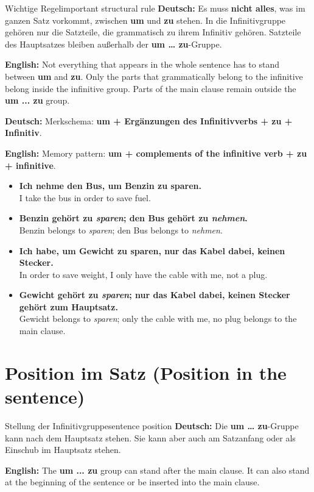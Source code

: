 \documentclass[a4paper,11pt]{article}
\newcommand{\GermanText}[1]{\textbf{Deutsch: }#1\par}
\newcommand{\EnglishText}[1]{{\small\color{SoftGray}\textbf{English: }#1\par}}
\newcommand{\ExampleItem}[2]{\item \textbf{#1}\\{\small\color{SoftGray}#2}}
\begin{document}
        \begin{grammarentry}{Wichtige Regel}{important structural rule}
            \GermanText{Es muss \textbf{nicht alles}, was im ganzen Satz vorkommt, zwischen \textbf{um} und \textbf{zu} stehen. In die Infinitivgruppe gehören nur die Satzteile, die grammatisch zu ihrem Infinitiv gehören. Satzteile des Hauptsatzes bleiben außerhalb der \textbf{um \ldots{} zu}-Gruppe.}
            \EnglishText{Not everything that appears in the whole sentence has to stand between \textbf{um} and \textbf{zu}. Only the parts that grammatically belong to the infinitive belong inside the infinitive group. Parts of the main clause remain outside the \textbf{um ... zu} group.}

            \GermanText{Merkschema: \textbf{um + Ergänzungen des Infinitivverbs + zu + Infinitiv}.}
            \EnglishText{Memory pattern: \textbf{um + complements of the infinitive verb + zu + infinitive}.}
        \end{grammarentry}

        \begin{exbox}
            \begin{itemize}
                \ExampleItem{Ich nehme den Bus, um Benzin zu sparen.}{I take the bus in order to save fuel.}
                \ExampleItem{Benzin gehört zu \textit{sparen}; den Bus gehört zu \textit{nehmen}.}{Benzin belongs to \textit{sparen}; den Bus belongs to \textit{nehmen}.}
                \ExampleItem{Ich habe, um Gewicht zu sparen, nur das Kabel dabei, keinen Stecker.}{In order to save weight, I only have the cable with me, not a plug.}
                \ExampleItem{Gewicht gehört zu \textit{sparen}; nur das Kabel dabei, keinen Stecker gehört zum Hauptsatz.}{Gewicht belongs to \textit{sparen}; only the cable with me, no plug belongs to the main clause.}
            \end{itemize}
        \end{exbox}


    \section{Position im Satz \textnormal{(Position in the sentence)}}

        \begin{grammarentry}{Stellung der Infinitivgruppe}{sentence position}
            \GermanText{Die \textbf{um \ldots{} zu}-Gruppe kann nach dem Hauptsatz stehen. Sie kann aber auch am Satzanfang oder als Einschub im Hauptsatz stehen.}
            \EnglishText{The \textbf{um ... zu} group can stand after the main clause. It can also stand at the beginning of the sentence or be inserted into the main clause.}
        \end{grammarentry}
\end{document}
